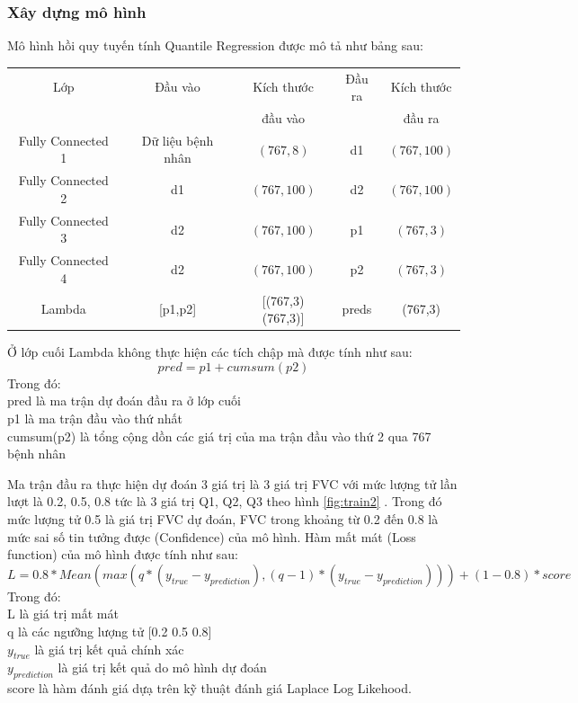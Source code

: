 \subsubsection{Xây dựng mô hình}
Mô hình hồi quy tuyến tính Quantile Regression được mô tả như bảng sau:\par
\begin{center}
\begin{tabular} {|c|c|c|c|c|}
\hline
Lớp & Đầu vào & Kích thước & Đầu ra & Kích thước \\
 & & đầu vào & &đầu ra\\
\hline
Fully Connected 1 & Dữ liệu bệnh nhân & $(767,8) $ & d1 & $(767,100)$ \\
\hline
Fully Connected 2 & d1 & $(767,100)$ & d2 &$(767,100)$ \\
\hline
Fully Connected 3 & d2 &$(767,100)$ & p1 &$(767,3)$ \\
\hline
Fully Connected 4 & d2 &$(767,100)$ & p2 &$(767,3)$ \\
\hline
Lambda & [p1,p2] & [(767,3)(767,3)] & preds & (767,3)\\
\hline
\end{tabular}
\label{tab:train1}
\end{center}
Ở lớp cuối Lambda không thực hiện các tích chập mà được tính như sau: $$pred = p1+ cumsum(p2)$$
Trong đó:\\
\tab pred là ma trận dự đoán đầu ra ở lớp cuối\\
\tab p1 là ma trận đầu vào thứ nhất\\
\tab cumsum(p2) là tổng cộng dồn các giá trị của ma trận đầu vào thứ 2 qua 767 bệnh nhân\par
Ma trận đầu ra thực hiện dự đoán 3 giá trị là 3 giá trị FVC với mức lượng tử lần lượt là 0.2, 0.5, 0.8 tức là 3 giá trị Q1, Q2, Q3 theo hình \ref{fig:train2} . Trong đó mức lượng tử 0.5 là giá trị FVC dự đoán, FVC trong khoảng từ 0.2 đến 0.8 là mức sai số tin tưởng được (Confidence) của mô hình.
Hàm mất mát (Loss function) của mô hình được tính như sau:
$$L= 0.8* Mean( max(q*(y_{true} -y_{prediction}),(q-1)* (y_{true} - y_{prediction}))) + (1-0.8)* score$$
Trong đó:\\
\tab L là giá trị mất mát\\
\tab q là các ngưỡng lượng tử [0.2 0.5 0.8]\\
\tab $y_{true}$ là giá trị kết quả chính xác\\
\tab $y_{prediction}$ là giá trị kết quả do mô hình dự đoán\\
\tab score là hàm đánh giá dựạ trên kỹ thuật đánh giá Laplace Log Likehood.\par
